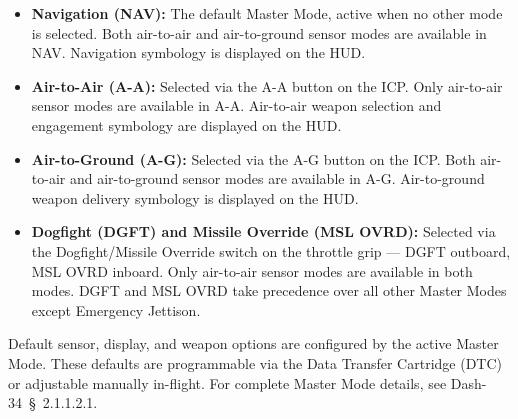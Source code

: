 \documentclass[11pt, a4paper, twoside]{report}
\newcommand{\dashref}[1]{Dash-34~\S~#1}
\begin{document}
\begin{itemize}

	\item \textbf{Navigation (NAV):} The default Master Mode, active when no other mode is selected. Both air-to-air and air-to-ground sensor modes are available in NAV. Navigation symbology is displayed on the HUD.
    \item \textbf{Air-to-Air (A-A):} Selected via the A-A button on the ICP. Only air-to-air sensor modes are available in A-A. Air-to-air weapon selection and engagement symbology are displayed on the HUD.
    \item \textbf{Air-to-Ground (A-G):} Selected via the A-G button on the ICP. Both air-to-air and air-to-ground sensor modes are available in A-G. Air-to-ground weapon delivery symbology is displayed on the HUD.
    \item \textbf{Dogfight (DGFT) and Missile Override (MSL OVRD):} Selected via the Dogfight/Missile Override switch on the throttle grip — DGFT outboard, MSL OVRD inboard. Only air-to-air sensor modes are available in both modes. DGFT and MSL OVRD take precedence over all other Master Modes except Emergency Jettison.

\end{itemize}

Default sensor, display, and weapon options are configured by the active Master Mode. These defaults are programmable via the Data Transfer Cartridge (DTC) or adjustable manually in-flight. For complete Master Mode details, see \dashref{2.1.1.2.1}.

\end{document}
